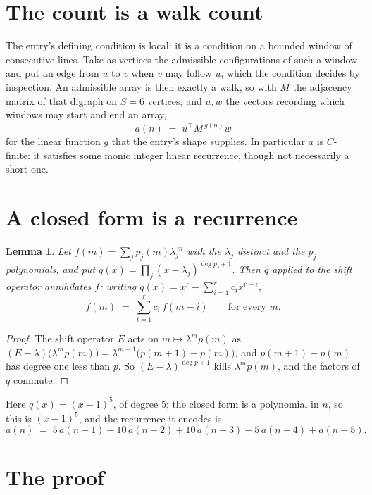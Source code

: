\documentclass[11pt,a4paper]{article}
\theoremstyle{plain}
\newtheorem{lemma}[theorem]{Lemma}
\theoremstyle{definition}
\begin{document}
\section{The count is a walk count}

The entry's defining condition is local: it is a condition on a bounded window of consecutive lines. Take as vertices the
admissible configurations of such a window and put an edge from $u$ to $v$ when $v$ may
follow $u$, which the condition decides by inspection. An admissible array is then exactly a
walk, so with $M$ the adjacency matrix of that digraph on $S=6$ vertices, and $u,w$ the
vectors recording which windows may start and end an array,
\[
a(n)\;=\;u^{\!\top}M^{\,g(n)}w
\]
for the linear function $g$ that the entry's shape supplies. In particular $a$ is
$C$-finite: it satisfies some monic integer linear recurrence, though not necessarily a short
one.

\section{A closed form is a recurrence}

\begin{lemma}\label{lem:ann}
Let $f(m)=\sum_{j}p_j(m)\lambda_j^{\,m}$ with the $\lambda_j$ distinct and the $p_j$
polynomials, and put $q(x)=\prod_j(x-\lambda_j)^{\deg p_j+1}$. Then $q$ applied to the shift
operator annihilates $f$: writing $q(x)=x^{r}-\sum_{i=1}^{r}c_ix^{r-i}$,
\[
f(m)\;=\;\sum_{i=1}^{r}c_i\,f(m-i)\qquad\text{for every }m.
\]
\end{lemma}

\begin{proof}
The shift operator $E$ acts on $m\mapsto\lambda^{m}p(m)$ as
$(E-\lambda)\bigl(\lambda^{m}p(m)\bigr)=\lambda^{m+1}\bigl(p(m+1)-p(m)\bigr)$, and
$p(m+1)-p(m)$ has degree one less than $p$. So $(E-\lambda)^{\deg p+1}$ kills
$\lambda^{m}p(m)$, and the factors of $q$ commute.
\end{proof}

Here $q(x)=(x-1)^{5}$, of degree $5$; the closed form is a polynomial in $n$, so this is $(x-1)^{5}$, and the recurrence it encodes is
\begin{equation}\label{eq:rec}
a(n)\;=\;5\,a(n-1) - 10\,a(n-2) + 10\,a(n-3) - 5\,a(n-4) + a(n-5).
\end{equation}

\section{The proof}
\end{document}
